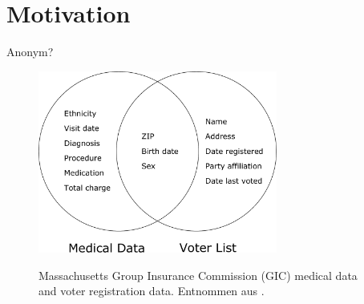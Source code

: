 \section{Motivation}

\begin{frame}{Anonym?}
	\begin{figure}%
		\centering
		\includegraphics[width=0.7\textwidth]{pic/sweeney_governor.pdf}
		\vspace{0.2cm}
	
		\tiny Massachusetts Group Insurance Commission (GIC) medical data and voter registration data. Entnommen aus \cite{sweeney_k_anonymity}.
	\end{figure}

\end{frame}

